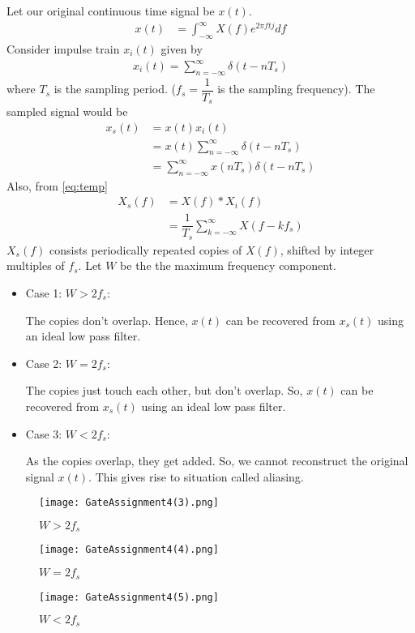 \documentclass[journal,12pt,twocolumn]{IEEEtran}
\begin{document}
Let our original continuous time signal be $x(t)$. \begin{align}
    x(t)&=\displaystyle\int_{-\infty}^{\infty}X(f)e^{2\pi ftj}df
\end{align} 
Consider impulse train $x_i(t)$ given by
\begin{align}
    x_i(t)=\displaystyle\sum_{n=-\infty}^{\infty}\delta(t-nT_s)
\end{align}
where $T_s$ is the sampling period. ($f_s=\dfrac{1}{T_s}$ is the sampling frequency). The sampled signal would be
\begin{align}
    x_s(t)&=x(t)x_i(t)\label{eq:temp}\\
    &=x(t)\displaystyle\sum_{n=-\infty}^{\infty}\delta(t-nT_s)\\
    &=\displaystyle\sum_{n=-\infty}^{\infty}x(nT_s)\delta(t-nT_s)
\end{align}
Also, from \eqref{eq:temp}
\begin{align}
    X_s(f)&=X(f)*X_i(f)\\
    &=\dfrac{1}{T_s}\displaystyle\sum_{k=-\infty}^{\infty}X(f-kf_s)
\end{align}
$X_s(f)$ consists periodically repeated copies of $X(f)$, shifted by integer multiples of $f_s$. Let $W$ be the the maximum frequency component. 
\begin{itemize}
    \item Case 1: $W>2f_s$: 
    
    The copies don't overlap. Hence, $x(t)$ can be recovered from $x_s(t)$ using an ideal low pass filter.
    \item Case 2: $W=2f_s$: 
    
    The copies just touch each other, but don't overlap. So, $x(t)$ can be recovered from $x_s(t)$ using an ideal low pass filter.
    \item Case 3: $W<2f_s$:
    
    As the copies overlap, they get added. So, we cannot reconstruct the original signal $x(t)$. This gives rise to situation called aliasing.
\end{itemize}
\begin{figure}[!h]
 \centering
 \texttt{[image: GateAssignment4(3).png]}
 \caption{$W>2f_s$}
 \label{plot}
\end{figure}
\begin{figure}[!h]
 \texttt{[image: GateAssignment4(4).png]}
 \caption{$W=2f_s$}
 \label{plot}
\end{figure}
\begin{figure}[!h]
 \texttt{[image: GateAssignment4(5).png]}
 \caption{$W<2f_s$}
 \label{plot}
\end{figure}
\end{document}
